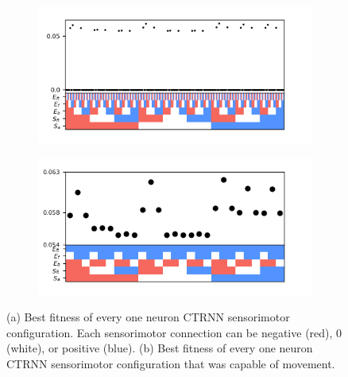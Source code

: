 \documentclass{article}
\begin{document}
\begin{figure}[htbp]
  \centering
  \begin{subfigure}[b]{0.5\textwidth}
    \vspace{0pt} %
    \centering
    \includegraphics[width=\textwidth]{../plots/scatter1.png}
    \caption{}
    \label{fig:scatterPlot1A}
  \end{subfigure}%
  \hspace{-15pt}%
  \begin{subfigure}[b]{0.5\textwidth}
    \vspace{0pt} %
    \centering
    \includegraphics[width=\textwidth]{../plots/scatter1Working.png}
    \caption{}
    \label{fig:scatterPlot1B}
  \end{subfigure}
  \caption{(a) Best fitness of every one neuron CTRNN sensorimotor configuration. Each sensorimotor connection can be negative (red), 0 (white), or positive (blue). (b) Best fitness of every one neuron CTRNN sensorimotor configuration that was capable of movement.}
  \label{fig:scatterPlots1}
\end{figure}
\end{document}
